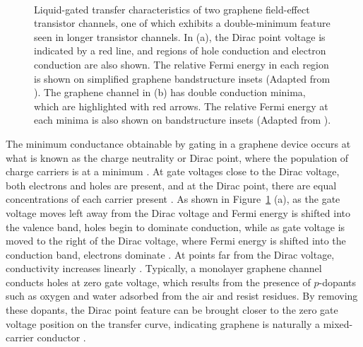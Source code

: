 \documentclass[
  a4paper,
]{scrbook}
\begin{document}
\begin{figure}
\begin{minipage}[t]{0.45\linewidth}
{{}

}

\end{minipage}%
%
\begin{minipage}[t]{0.01\linewidth}

{\centering 

~

}

\end{minipage}%

\caption[Liquid-gated transfer characteristics of two graphene
field-effect transistor channels, one of which exhibits a double-minimum
feature seen in longer transistor
channels.]{\label{fig-graphene-characteristics}Liquid-gated transfer
characteristics of two graphene field-effect transistor channels, one of
which exhibits a double-minimum feature seen in longer transistor
channels. In (a), the Dirac point voltage is indicated by a red line,
and regions of hole conduction and electron conduction are also shown.
The relative Fermi energy in each region is shown on simplified graphene
bandstructure insets (Adapted from \autocite{Geim2007,Ohno2015}). The
graphene channel in (b) has double conduction minima, which are
highlighted with red arrows. The relative Fermi energy at each minima is
also shown on bandstructure insets (Adapted from \autocite{Peng2018}).}

\end{figure}

The minimum conductance obtainable by gating in a graphene device occurs
at what is known as the charge neutrality or Dirac point, where the
population of charge carriers is at a minimum
\autocite{Novoselov2004,Bartolomeo2011,Ohno2015,Kireev2017}. At gate
voltages close to the Dirac voltage, both electrons and holes are
present, and at the Dirac point, there are equal concentrations of each
carrier present \autocite{Novoselov2004,Bartolomeo2011,Peng2018}. As
shown in Figure~\ref{fig-graphene-characteristics} (a), as the gate
voltage moves left away from the Dirac voltage and Fermi energy is
shifted into the valence band, holes begin to dominate conduction, while
as gate voltage is moved to the right of the Dirac voltage, where Fermi
energy is shifted into the conduction band, electrons dominate
\autocite{Novoselov2004,Bartolomeo2011,Feng2014,Zhang2015}. At points
far from the Dirac voltage, conductivity increases linearly
\autocite{Novoselov2004,Bartolomeo2011,Peng2018}. Typically, a monolayer
graphene channel conducts holes at zero gate voltage, which results from
the presence of \(p\)-dopants such as oxygen and water adsorbed from the
air and resist residues. By removing these dopants, the Dirac point
feature can be brought closer to the zero gate voltage position on the
transfer curve, indicating graphene is naturally a mixed-carrier
conductor
\autocite{Novoselov2004,Bartolomeo2011,Zhang2015,Kireev2017,Peng2018}.
\end{document}
